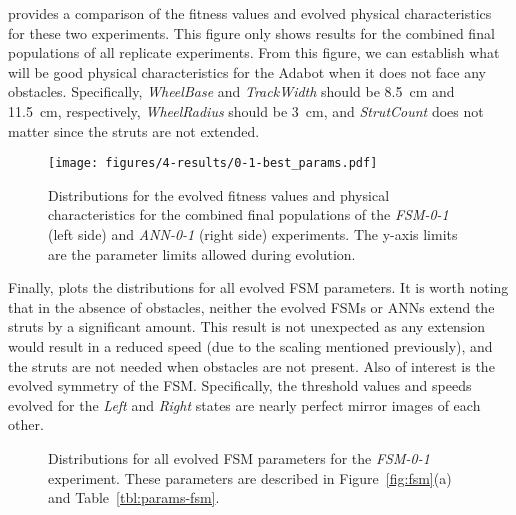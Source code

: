  provides a comparison of the fitness values and evolved physical characteristics for these two experiments.
%
This figure only shows results for the combined final populations of all replicate experiments.
%
From this figure, we can establish what will be good physical characteristics for the Adabot when it does not face any obstacles.
%
Specifically, \emph{WheelBase} and \emph{TrackWidth} should be 8.5~\si{cm} and 11.5~\si{cm}, respectively, \emph{WheelRadius} should be 3~\si{cm}, and \emph{StrutCount} does not matter since the struts are not extended.


\begin{figure}[!ht]
    \centering

    \texttt{[image: figures/4-results/0-1-best\_params.pdf]}


    \caption{Distributions for the evolved fitness values and physical characteristics for the combined final populations of the \emph{FSM-0-1} (left side) and \emph{ANN-0-1} (right side) experiments. The y-axis limits are the parameter limits allowed during evolution.}
    \label{fig:0-1-best-params}


\end{figure}


Finally,  plots the distributions for all evolved FSM parameters.
%
It is worth noting that in the absence of obstacles, neither the evolved FSMs or ANNs extend the struts by a significant amount.
%
This result is not unexpected as any extension would result in a reduced speed (due to the scaling mentioned previously), and the struts are not needed when obstacles are not present.
%
Also of interest is the evolved symmetry of the FSM.
%
Specifically, the threshold values and speeds evolved for the \emph{Left} and \emph{Right} states are nearly perfect mirror images of each other.


\begin{figure*}[!ht]
    \centering







    \caption{Distributions for all evolved FSM parameters for the \emph{FSM-0-1} experiment. These parameters are described in Figure~\ref{fig:fsm}(a) and Table~\ref{tbl:params-fsm}.}
    \label{fig:FSM-best-params}
\end{figure*}


